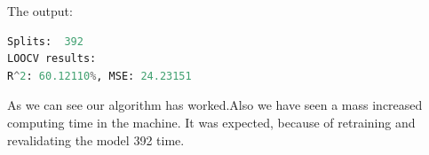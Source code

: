 The output:
\begin{lstlisting}[language=Python]
Splits:  392
LOOCV results:
R^2: 60.12110%, MSE: 24.23151
\end{lstlisting}

As we can see our algorithm has worked.Also we have seen a mass increased computing time in the machine. It was expected, because of retraining and revalidating the model 392 time.